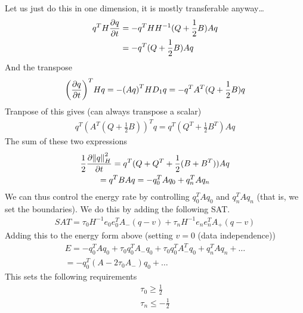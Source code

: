\documentclass[british]{scrartcl}
\begin{document}
Let us just do this in one dimension, it is mostly transferable anyway\ldots
\begin{align}
    q^T H \pdv{q}{t} &= -q^T H H^{-1} (Q + \frac{1}{2}B) A q \\
     &= - q^T (Q + \frac{1}{2} B ) A q
\end{align}
And the transpose
\begin{align}
    {\left(\pdv{q}{t}\right)}^T H q = -{(Aq)}^T H D_1 q = -q^T A^T (Q + \frac{1}{2}B) q
\end{align}
Tranpose of this gives (can always transpose a scalar)
\begin{align}
    q^T {(A^T (Q + \frac{1}{2}B))}^T q = q^T (Q^T + \frac{1}{2}B^T) A q
\end{align}
The sum of these two expressions
\begin{gather}
    \frac{1}{2}\pdv{\norm{q}^2_H}{t} = q^T (Q + Q^T + \frac{1}{2}(B + B^T)) A q \\
    = q^T B A q = -q_0^T A q_0 + q_n^T A q_n
\end{gather}
We can thus control the energy rate by controlling $q_0^T A q_0$ and $q_n^T A q_n$ (that is, we set the boundaries). We do this by adding the following SAT\@.
\begin{gather}
    SAT = \tau_0 H^{-1} e_0 e_0^T A_- (q - v) + \tau_n H^{-1} e_n e_n^T A_+ (q - v)
\end{gather}
Adding this to the energy form above (setting $v=0$ (data independence))
\begin{gather}
    E = -q_0^T A q_0 + \tau_0 q_0^T A_- q_0 + \tau_0 q_0^T A_-^T q_0
     + q_n^T A q_n + \ldots \\
     = -q_0^T (A - 2\tau_0 A_-) q_0 + \ldots
\end{gather}
This sets the following requirements
\begin{gather}
    \tau_0 \ge \frac{1}{2} \\
    \tau_n \le -\frac{1}{2}
\end{gather}
\end{document}
